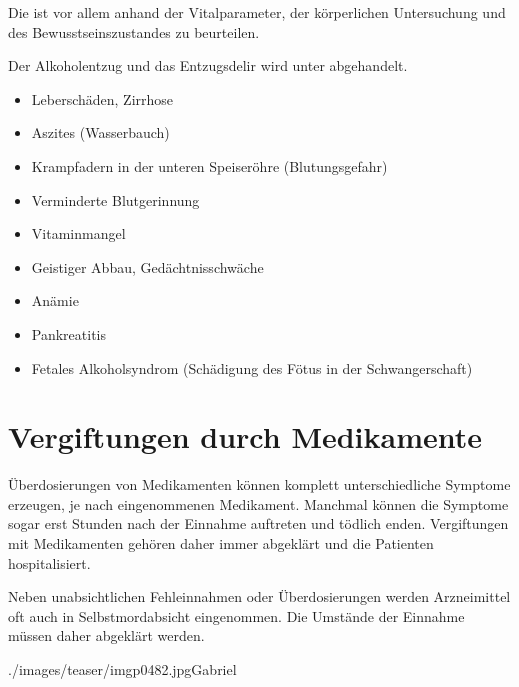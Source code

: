 Die  ist vor allem anhand der
Vitalparameter, der körperlichen Untersuchung und des
Bewusstseinszustandes zu beurteilen.



Der Alkoholentzug und das Entzugsdelir wird unter
 abgehandelt.

{
\begin{itemize}
    \item Leberschäden, Zirrhose
    \item Aszites (Wasserbauch)
    \item Krampfadern in der unteren Speiseröhre  (Blutungsgefahr)
    \item Verminderte Blutgerinnung
    \item Vitaminmangel
    \item Geistiger Abbau, Gedächtnisschwäche
    \item Anämie
    \item Pankreatitis
    \item Fetales Alkoholsyndrom (Schädigung des Fötus in der Schwangerschaft)
    \cite{Jones1973,Guerri2009}
\end{itemize}
}{	

}{}{}{}













\section{Vergiftungen durch Medikamente}

{
Überdosierungen von Medikamenten können komplett
unterschiedliche Symptome erzeugen, je nach eingenommenen
Medikament. Manchmal können die Symptome sogar erst Stunden
nach der Einnahme auftreten und tödlich enden. Vergiftungen
mit Medikamenten gehören daher immer abgeklärt und die
Patienten hospitalisiert. 

Neben unabsichtlichen Fehleinnahmen oder Überdosierungen
werden Arzneimittel oft auch in Selbstmordabsicht
eingenommen. Die Umstände der Einnahme müssen daher
abgeklärt werden.
}{

}{./images/teaser/imgp0482.jpg}{}{Gabriel}

